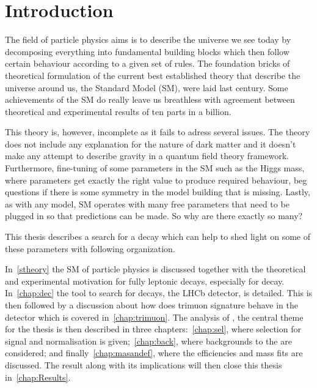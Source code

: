 \chapter{Introduction}



The field of particle physics aims is to describe the universe we see today by decomposing everything into fundamental building blocks which then follow certain behaviour according to a given set of rules. The foundation bricks of theoretical formulation of the current best established theory that describe the universe around us, the Standard Model (\Gls{SM}), were laid last century. Some achievements of the \gls{SM} do really leave us breathless with agreement between theoretical and experimental results of ten parts in a billion. 

This theory is, however, incomplete as it fails to adress several issues. The theory does not include any explanation for the nature of dark matter and it doesn't make any attempt to describe gravity in a quantum field theory framework. Furthermore, fine-tuning of some parameters in the \gls{SM} such as the Higgs mass, where parameters get exactly the right value to produce required behaviour, beg questions if there is some symmetry in the model building that is missing. Lastly, as with any model, SM operates with many free parameters that need to be plugged in so that predictions can be made. So why are there exactly so many?

This thesis describes a search for a decay which can help to shed light on some of these parameters with following organization.

In~\autoref{stheory} the \gls{SM} of particle physics is discussed together with the theoretical and experimental motivation for fully leptonic decays, especially for \Bmumumu decay. In~\autoref{chap:dec} the tool to search for \Bmumumu decays, the LHCb detector, is detailed. This is then followed by a discussion about how does trimuon signature behave in the detector which is covered in~\autoref{chap:trimuon}. The analysis of \Bmumumu, the central theme for the thesis is then described in three chapters:~\autoref{chap:sel}, where selection for signal and normalisation is given;~\autoref{chap:back}, where backgrounds to the \Bmumumu are considered; and finally~\autoref{chap:masandef}, where the efficiencies and mass fits are discussed. The result along with its implications will then close this thesis in~\autoref{chap:Results}.

